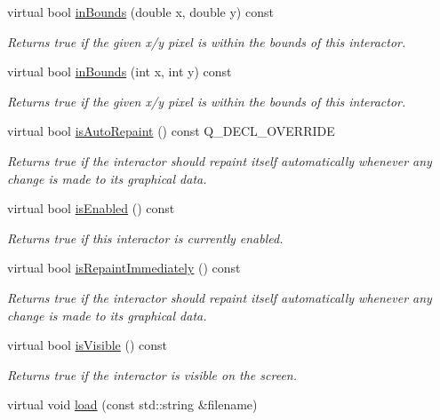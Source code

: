 \begin{DoxyCompactItemize}
virtual bool \mbox{\hyperlink{classGInteractor_afc480f652b8c5f1fb255e2269ce68879}{in\+Bounds}} (double x, double y) const
\begin{DoxyCompactList}\small\item\em Returns true if the given x/y pixel is within the bounds of this interactor. \end{DoxyCompactList}\item 
virtual bool \mbox{\hyperlink{classGInteractor_ae6d7982c1c627b677a5e776ca86118ed}{in\+Bounds}} (int x, int y) const
\begin{DoxyCompactList}\small\item\em Returns true if the given x/y pixel is within the bounds of this interactor. \end{DoxyCompactList}\item 
virtual bool \mbox{\hyperlink{classGCanvas_aa0b3b78666686fcd2a5b33a20febef0f}{is\+Auto\+Repaint}} () const Q\+\_\+\+D\+E\+C\+L\+\_\+\+O\+V\+E\+R\+R\+I\+DE
\begin{DoxyCompactList}\small\item\em Returns true if the interactor should repaint itself automatically whenever any change is made to its graphical data. \end{DoxyCompactList}\item 
virtual bool \mbox{\hyperlink{classGInteractor_aacb819fb241851fd9fc045271baa4034}{is\+Enabled}} () const
\begin{DoxyCompactList}\small\item\em Returns true if this interactor is currently enabled. \end{DoxyCompactList}\item 
virtual bool \mbox{\hyperlink{classGDrawingSurface_a82a00267c81cc0ae85ee0feb01a92fa8}{is\+Repaint\+Immediately}} () const
\begin{DoxyCompactList}\small\item\em Returns true if the interactor should repaint itself automatically whenever any change is made to its graphical data. \end{DoxyCompactList}\item 
virtual bool \mbox{\hyperlink{classGInteractor_a9d8a6cfb13917785c143e74d40e4e2be}{is\+Visible}} () const
\begin{DoxyCompactList}\small\item\em Returns true if the interactor is visible on the screen. \end{DoxyCompactList}\item 
virtual void \mbox{\hyperlink{classGCanvas_a6c21edd9d285c925527e3209fca54b01}{load}} (const std\+::string \&filename)

\end{DoxyCompactItemize}
